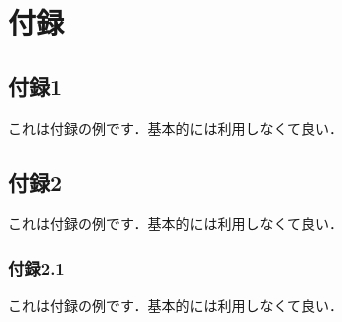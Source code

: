 \chapter{付録}
\def\thesection{\Alph{section}}

\section{付録1}

これは付録の例です．基本的には利用しなくて良い．

\section{付録2}

これは付録の例です．基本的には利用しなくて良い．

\subsection{付録2.1}

これは付録の例です．基本的には利用しなくて良い．
